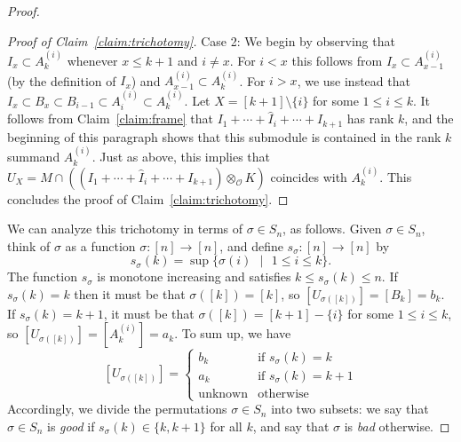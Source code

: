 \documentclass[11 pt]{article}
\theoremstyle{plain}
\theoremstyle{definition}
\numberwithin{equation}{section}
\newcommand\Set[2]{\ensuremath{\{\text{#1 $|$ #2}\}}}
\renewcommand{\O}{\mathcal{O}}
\newcommand\tensor{\otimes}
\begin{document}
\begin{proof}
\begin{proof}[Proof of Claim~\ref{claim:trichotomy}]
Case 2: We begin by observing that $I_x\subset A_k^{(i)}$ whenever $x\leq k+1$ and $i\neq x$.  For $i<x$ this follows 
from  $I_x\subset A_{x-1}^{(i)}$ (by the definition of $I_x$) and 
$A_{x-1}^{(i)}\subset A_k^{(i)}$.  For $i> x$, we use instead that 
$I_x\subset B_x\subset B_{i-1}\subset A_i^{(i)}\subset A_k^{(i)}$.  
Let $X=[k+1]\setminus\{i\}$ for some $1\leq i\leq k$. It follows from Claim~\ref{claim:frame} that $I_1+\cdots+\widehat{I}_i+\cdots+I_{k+1}$ has rank $k$, and the beginning of this paragraph shows that this submodule is contained in the rank $k$ summand $A_k^{(i)}$. Just as above, this implies that $U_X=M\cap((I_1+\cdots+\widehat{I}_i+\cdots+I_{k+1})\tensor_\O K)$ coincides with $A_k^{(i)}$. This concludes the proof of Claim~\ref{claim:trichotomy}.
\end{proof}

We can analyze this trichotomy in terms of $\sigma\in S_n$, as follows.  Given 
$\sigma\in S_n$, think of $\sigma$ as a function $\sigma\colon [n]\to [n]$, and 
define $s_\sigma\colon [n]\to [n]$ by 
\[s_\sigma(k)=\sup\Set{$\sigma(i)$}{$1\leq i\leq k$}.\]
The function $s_\sigma$ is monotone increasing and satisfies $k\leq s_\sigma(k)\leq n$.
If $s_\sigma(k)=k$ then it must be that $\sigma([k])=[k]$, so $[U_{\sigma([k])}]=[B_k]=b_k$. 
If $s_\sigma(k)=k+1$, it must be that $\sigma([k])=[k+1]-\{i\}$ for some $1\leq i\leq k$, so 
$[U_{\sigma([k])}]=[A_k^{(i)}]=a_k$.  To sum up, we have
\begin{equation}
\label{eq:clVsigma}
[U_{\sigma([k])}]=\begin{cases}
b_k&\text{if }s_\sigma(k)=k\\
a_k&\text{if }s_\sigma(k)=k+1\\
\text{unknown}&\text{otherwise}
\end{cases}
\end{equation}
Accordingly, we divide the permutations $\sigma\in S_n$ into two subsets: we say that 
$\sigma\in S_n$ is \emph{good} if $s_\sigma(k)\in \{k,k+1\}$ for all $k$, and say that 
$\sigma$ is \emph{bad} otherwise.  


\end{proof}
\end{document}
